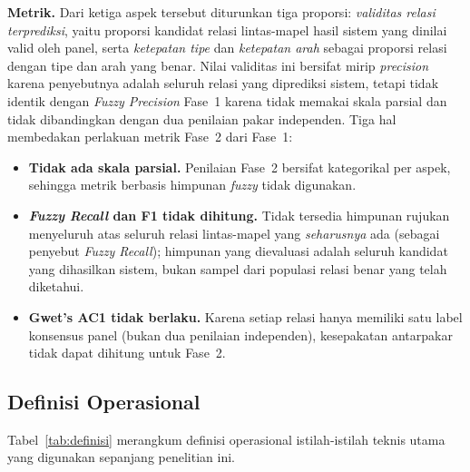 \documentclass[../../thesis]{subfiles}
\begin{document}
\textbf{Metrik.} Dari ketiga aspek tersebut diturunkan tiga proporsi:
\textit{validitas relasi terprediksi}, yaitu proporsi kandidat relasi
lintas-mapel hasil sistem yang dinilai valid oleh panel, serta \textit{ketepatan
tipe} dan \textit{ketepatan arah} sebagai proporsi relasi dengan tipe dan arah
yang benar. Nilai validitas ini bersifat mirip \textit{precision} karena
penyebutnya adalah seluruh relasi yang diprediksi sistem, tetapi tidak identik
dengan \textit{Fuzzy Precision} Fase~1 karena tidak memakai skala parsial dan
tidak dibandingkan dengan dua penilaian pakar independen. Tiga hal membedakan
perlakuan metrik Fase~2 dari Fase~1:

\begin{itemize}
  \item \textbf{Tidak ada skala parsial.} Penilaian Fase~2 bersifat
        kategorikal per aspek, sehingga metrik berbasis himpunan \textit{fuzzy}
        tidak digunakan.
  \item \textbf{\textit{Fuzzy Recall} dan F1 tidak dihitung.} Tidak tersedia himpunan
        rujukan menyeluruh atas seluruh relasi lintas-mapel yang
        \emph{seharusnya} ada (sebagai penyebut \textit{Fuzzy Recall}); himpunan yang
        dievaluasi adalah seluruh kandidat yang dihasilkan sistem, bukan sampel
        dari populasi relasi benar yang telah diketahui.
  \item \textbf{Gwet's AC1 tidak berlaku.} Karena setiap relasi hanya memiliki
        satu label konsensus panel (bukan dua penilaian independen), kesepakatan
        antarpakar tidak dapat dihitung untuk Fase~2.
\end{itemize}

\subsection{Definisi Operasional}\label{subsec:definisi-operasional}

Tabel~\ref{tab:definisi} merangkum definisi operasional istilah-istilah
teknis utama yang digunakan sepanjang penelitian ini.
\end{document}
